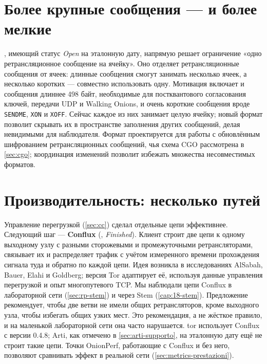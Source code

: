 \section{Более крупные сообщения — и более мелкие}\label{sec:fut-340}

, имеющий статус \emph{Open} на эталонную дату, напрямую решает ограничение «одно ретрансляционное сообщение на ячейку». Оно отделяет ретрансляционные сообщения от ячеек: длинные сообщения смогут занимать несколько ячеек, а несколько коротких — совместно использовать одну. Мотивация включает и сообщения длиннее 498 байт, необходимые для постквантового согласования ключей, передачи UDP и Walking Onions, и очень короткие сообщения вроде \texttt{SENDME}, \texttt{XON} и \texttt{XOFF}. Сейчас каждое из них занимает целую ячейку; новый формат позволит скрывать их в пространстве заполнения других сообщений, делая невидимыми для наблюдателя. Формат проектируется для работы с обновлённым шифрованием ретрансляционных сообщений, чья схема CGO рассмотрена в \cref{sec:cgo}; координация изменений позволит избежать множества несовместимых форматов.

\section{Производительность: несколько путей}\label{sec:fut-conflux}

Управление перегрузкой (\cref{sec:cc}) сделал отдельные цепи эффективнее. Следующий шаг — \textbf{Conflux} (, \emph{Finished}). Клиент строит две цепи к одному выходному узлу с разными сторожевыми и промежуточными ретрансляторами, связывает их и распределяет трафик с учётом измеренного времени прохождения сигнала туда и обратно по каждой цепи. Идея возникла в исследованиях AlSabah, Bauer, Elahi и Goldberg; версия Tor адаптирует её, используя данные управления перегрузкой и опыт многопутевого TCP. Мы наблюдали цепи Conflux в лабораторной сети (\cref{sec:rp-stem}) и через Stem (\cref{cap:18-stem}). Предложение рекомендует, чтобы две ветви не имели общих ретрансляторов, кроме выходного узла, чтобы избегать общих узких мест. Это рекомендация, а не жёсткое правило, и на маленькой лабораторной сети она часто нарушается. tor использует Conflux с версии 0.4.8; Arti, как отмечено в \cref{sec:arti-supporto}, на эталонную дату ещё не строит такие цепи. Точки OnionPerf, работающие с Conflux и без него, позволяют сравнивать эффект в реальной сети (\cref{sec:metrics-prestazioni}).

